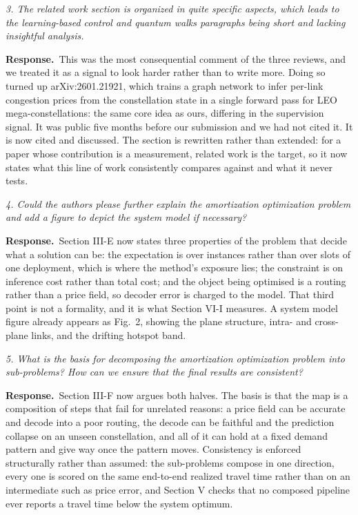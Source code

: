 \documentclass[11pt]{article}
\newcommand{\rc}[1]{\medskip\noindent\textit{\textcolor{black!65}{#1}}\par\smallskip}
\newcommand{\ans}{\noindent\textbf{Response.}\ }
\begin{document}
\rc{3. The related work section is organized in quite specific aspects, which leads to the
learning-based control and quantum walks paragraphs being short and lacking insightful analysis.}
\ans This was the most consequential comment of the three reviews, and we treated it as a signal to
look harder rather than to write more. Doing so turned up arXiv:2601.21921, which trains a graph
network to infer per-link congestion prices from the constellation state in a single forward pass
for LEO mega-constellations: the same core idea as ours, differing in the supervision signal. It
was public five months before our submission and we had not cited it. It is now cited and
discussed. The section is rewritten rather than extended: for a paper whose contribution is a
measurement, related work is the target, so it now states what this line of work consistently
compares against and what it never tests.

\rc{4. Could the authors please further explain the amortization optimization problem and add a
figure to depict the system model if necessary?}
\ans Section III-E now states three properties of the problem that decide what a solution can be:
the expectation is over instances rather than over slots of one deployment, which is where the
method's exposure lies; the constraint is on inference cost rather than total cost; and the object
being optimised is a routing rather than a price field, so decoder error is charged to the model.
That third point is not a formality, and it is what Section VI-I measures. A system model figure
already appears as Fig.\ 2, showing the plane structure, intra- and cross-plane links, and the
drifting hotspot band.

\rc{5. What is the basis for decomposing the amortization optimization problem into sub-problems?
How can we ensure that the final results are consistent?}
\ans Section III-F now argues both halves. The basis is that the map is a composition of steps that
fail for unrelated reasons: a price field can be accurate and decode into a poor routing, the
decode can be faithful and the prediction collapse on an unseen constellation, and all of it can
hold at a fixed demand pattern and give way once the pattern moves. Consistency is enforced
structurally rather than assumed: the sub-problems compose in one direction, every one is scored on
the same end-to-end realized travel time rather than on an intermediate such as price error, and
Section V checks that no composed pipeline ever reports a travel time below the system optimum.
\end{document}
